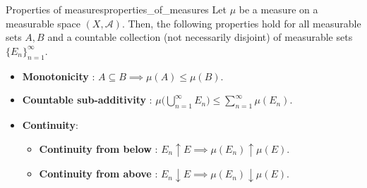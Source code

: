 \begin{proposition}{Properties of measures}{properties_of_measures}
    Let $\mu$ be a measure on a measurable space $(X, \mathcal{A})$. Then, the following properties hold for all measurable sets $A, B$ and a countable collection (not necessarily disjoint) of measurable sets $\{E_n\}_{n=1}^\infty$.
    \begin{itemize}
        \item \textbf{Monotonicity} : $A \subseteq B \implies \mu(A) \le \mu(B)$.
        \item \textbf{Countable sub-additivity} : $\mu\Big( \bigcup_{n=1}^\infty E_n \Big) \le \sum_{n=1}^\infty \mu(E_n)$.
        \item \textbf{Continuity}:
        \begin{itemize}
            \item \textbf{Continuity from below} : $E_n \uparrow E\implies \mu(E_n) \uparrow \mu(E)$.
            \item \textbf{Continuity from above} : $E_n \downarrow E\implies \mu(E_n) \downarrow \mu(E)$.
        \end{itemize}
    \end{itemize}
\end{proposition}
